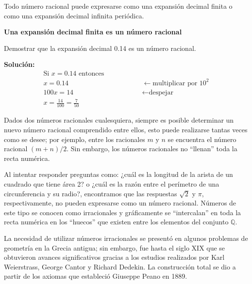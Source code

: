 \begin{tcolorbox}[colback=blue!12!white]
	\begin{thm} \end{thm}
	Todo número racional puede expresarse como una expansión decimal finita o como una expansión decimal infinita periódica.
\end{tcolorbox}

\begin{examp}{\textbf{Una expansión decimal finita es un número racional}}

	\noindent Demostrar que la expansión decimal 0.14 es un número racional.
	
	\vspace{0.5cm}
	
	\noindent \textbf{Solución:}
	\begin{eqnarray*}
		\mbox{Si } x = 0.14 \mbox{ entonces} &  & \\
		x = 0.14 &  & \qquad \qquad \leftarrow \mbox{multiplicar por }10^2\\
		100 x = 14 &  & \qquad \qquad \leftarrow \mbox{despejar}\\
		x = \frac{14}{100} = \frac{7}{50}& &
	\end{eqnarray*}
\end{examp}

Dados dos números racionales cualesquiera, siempre es posible determinar un nuevo número racional comprendido entre ellos, esto puede realizarse tantas veces como se desee; por ejemplo, entre los racionales $m$ y $n$ se encuentra el número racional $(m + n)/2$. Sin embargo, los números racionales no ``llenan'' toda la recta numérica.

Al intentar responder preguntas como: ¿cuál es la longitud de la arista de un cuadrado que tiene área 2? o ¿cuál es la razón entre el perímetro de una circunferencia y su radio?, encontramos que las respuestas $\sqrt{2}$ y $\pi$, respectivamente, no pueden expresarse como un número racional. Números de este tipo se conocen como irracionales y gráficamente se “intercalan” en toda la recta numérica en los ``huecos'' que existen entre los elementos del conjunto $\mathbb{Q}$. 

La necesidad de utilizar números irracionales se presentó en algunos problemas de geometría en la Grecia antigua; sin embargo, fue hasta el siglo XIX que se obtuvieron avances significativos gracias a los estudios realizados por Karl Weierstrass, George Cantor y Richard Dedekin.
La construcción total se dio a partir de los axiomas que estableció Giuseppe Peano en 1889.

